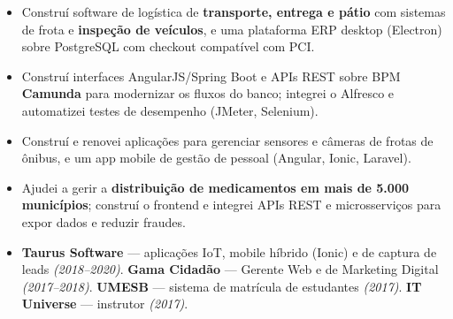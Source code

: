 \documentclass[10pt,a4paper]{altacv}
\begin{document}
\begin{itemize}
\item Construí software de logística de \textbf{transporte, entrega e pátio} com sistemas de frota e \textbf{inspeção de veículos}, e uma plataforma ERP desktop (Electron) sobre PostgreSQL com checkout compatível com PCI.
\end{itemize}
\divider

\begin{itemize}
\item Construí interfaces AngularJS/Spring Boot e APIs REST sobre BPM \textbf{Camunda} para modernizar os fluxos do banco; integrei o Alfresco e automatizei testes de desempenho (JMeter, Selenium).
\end{itemize}
\divider

\begin{itemize}
\item Construí e renovei aplicações para gerenciar sensores e câmeras de frotas de ônibus, e um app mobile de gestão de pessoal (Angular, Ionic, Laravel).
\end{itemize}
\divider

\begin{itemize}
\item Ajudei a gerir a \textbf{distribuição de medicamentos em mais de 5.000 municípios}; construí o frontend e integrei APIs REST e microsserviços para expor dados e reduzir fraudes.
\end{itemize}

\begin{itemize}
\item \textbf{Taurus Software} — aplicações IoT, mobile híbrido (Ionic) e de captura de leads \emph{(2018--2020)}. \quad \textbf{Gama Cidadão} — Gerente Web e de Marketing Digital \emph{(2017--2018)}. \quad \textbf{UMESB} — sistema de matrícula de estudantes \emph{(2017)}. \quad \textbf{IT Universe} — instrutor \emph{(2017)}.
\end{itemize}
\end{document}
